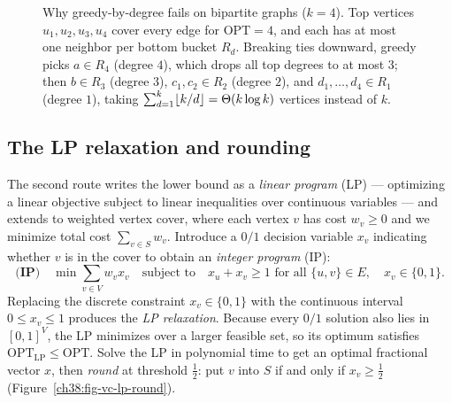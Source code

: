 \begin{figure}[htbp]
\caption{Why greedy-by-degree fails on bipartite graphs ($k=4$). Top vertices $u_1,u_2,u_3,u_4$ cover every edge for $\mathrm{OPT}=4$, and each has at most one neighbor per bottom bucket $R_d$. Breaking ties downward, greedy picks $a \in R_4$ (degree $4$), which drops all top degrees to at most $3$; then $b \in R_3$ (degree $3$), $c_1,c_2 \in R_2$ (degree $2$), and $d_1,\dots,d_4 \in R_1$ (degree $1$), taking $\sum_{d=1}^k \lfloor k/d\rfloor = \Theta(k\log k)$ vertices instead of $k$.}
\label{ch38:fig-vc-greedy-trap}
\end{figure}

\subsection{The LP relaxation and rounding}

The second route writes the lower bound as a \emph{linear program} (LP) --- optimizing a linear objective
subject to linear inequalities over continuous variables --- and extends to weighted vertex cover, where
each vertex $v$ has cost $w_v\ge 0$ and we minimize total cost $\sum_{v\in S} w_v$. Introduce a $0/1$
decision variable $x_v$ indicating whether $v$ is in the cover to obtain an \emph{integer program} (IP):
\[
  \textbf{(IP)}\quad \min \sum_{v\in V} w_v x_v
  \quad\text{subject to}\quad x_u + x_v \ge 1 \text{ for all } \{u,v\}\in E,\quad x_v\in\{0,1\}.
\]
Replacing the discrete constraint $x_v\in\{0,1\}$ with the continuous interval $0 \le x_v \le 1$ produces
the \emph{LP relaxation}. Because every $0/1$ solution also lies in $[0,1]^V$, the LP minimizes over a
larger feasible set, so its optimum satisfies $\mathrm{OPT}_{\mathrm{LP}}\le\mathrm{OPT}$. Solve the LP
in polynomial time to get an optimal fractional vector $x$, then \emph{round} at threshold $\tfrac12$:
put $v$ into $S$ if and only if $x_v\ge \tfrac12$ (Figure~\ref{ch38:fig-vc-lp-round}).

